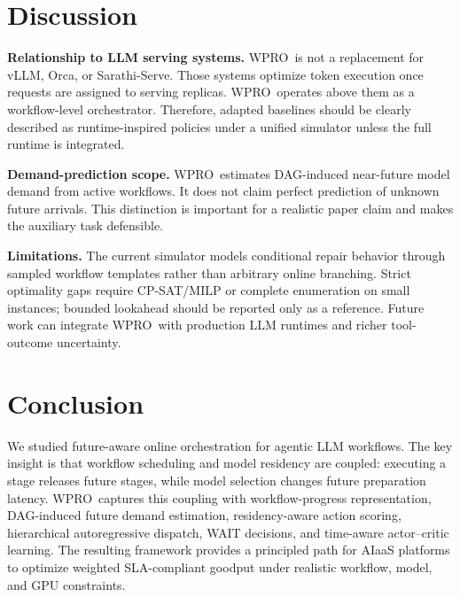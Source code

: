 \documentclass[10pt,conference]{IEEEtran}
\newcommand{\WPRO}{\textsc{WPRO}}
\begin{document}
\section{Discussion}

\textbf{Relationship to LLM serving systems.}
\WPRO\ is not a replacement for vLLM, Orca, or Sarathi-Serve. Those systems optimize token execution once requests are assigned to serving replicas. \WPRO\ operates above them as a workflow-level orchestrator. Therefore, adapted baselines should be clearly described as runtime-inspired policies under a unified simulator unless the full runtime is integrated.

\textbf{Demand-prediction scope.}
\WPRO\ estimates DAG-induced near-future model demand from active workflows. It does not claim perfect prediction of unknown future arrivals. This distinction is important for a realistic paper claim and makes the auxiliary task defensible.

\textbf{Limitations.}
The current simulator models conditional repair behavior through sampled workflow templates rather than arbitrary online branching. Strict optimality gaps require CP-SAT/MILP or complete enumeration on small instances; bounded lookahead should be reported only as a reference. Future work can integrate \WPRO\ with production LLM runtimes and richer tool-outcome uncertainty.

\section{Conclusion}

We studied future-aware online orchestration for agentic LLM workflows. The key insight is that workflow scheduling and model residency are coupled: executing a stage releases future stages, while model selection changes future preparation latency. \WPRO\ captures this coupling with workflow-progress representation, DAG-induced future demand estimation, residency-aware action scoring, hierarchical autoregressive dispatch, WAIT decisions, and time-aware actor--critic learning. The resulting framework provides a principled path for AIaaS platforms to optimize weighted SLA-compliant goodput under realistic workflow, model, and GPU constraints.



\end{document}
